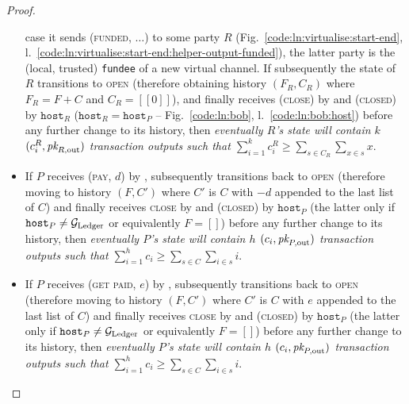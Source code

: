 \begin{proof}
\begin{itemize}
    case it sends (\textsc{funded}, $\dots$) to some party $R$
    (Fig.~\ref{code:ln:virtualise:start-end},
    l.~\ref{code:ln:virtualise:start-end:helper-output-funded}), the latter
    party is the (local, trusted) \texttt{fundee} of a new virtual channel. If
    subsequently the state of $R$ transitions to \textsc{open} (therefore
    obtaining history $(F_R, C_R)$ where $F_R = F + C$ and $C_R = [[0]]$), and
    finally receives (\textsc{close}) by \environment and (\textsc{closed}) by
    $\texttt{host}_R$ ($\texttt{host}_R = \texttt{host}_P$ --
    Fig.~\ref{code:ln:bob}, l.~\ref{code:ln:bob:host}) before any further change
    to its history, then \emph{eventually $R$'s \ledger state will contain $k$
    $(c^R_i, \textit{pk}_{R, \mathrm{out}})$ transaction outputs such that
    $\sum\limits_{i=1}^k c^R_i \geq \sum\limits_{s \in C_R} \sum\limits_{x \in
    s} x$}.
    \item If $P$ receives (\textsc{pay}, $d$) by \environment, subsequently
    transitions back to \textsc{open} (therefore moving to history $(F, C')$
    where $C'$ is $C$ with $-d$ appended to the last list of $C$) and finally
    receives \textsc{close} by \environment and (\textsc{closed}) by
    $\texttt{host}_P$ (the latter only if $\texttt{host}_P \neq \mathcal{G}_{\mathrm{Ledger}}$ or
    equivalently $F = []$) before any further change to its history, then
    \emph{eventually $P$'s \ledger state will contain $h$ $(c_i, \textit{pk}_{P,
    \mathrm{out}})$ transaction outputs such that $\sum\limits_{i=1}^h c_i \geq
    \sum\limits_{s \in C} \sum\limits_{i \in s} i$}.
    \item If $P$ receives (\textsc{get paid}, $e$) by \environment, subsequently
    transitions back to \textsc{open} (therefore moving to history $(F, C')$
    where $C'$ is $C$ with $e$ appended to the last list of $C$) and finally
    receives \textsc{close} by \environment and (\textsc{closed}) by
    $\texttt{host}_P$ (the latter only if $\texttt{host}_P \neq \mathcal{G}_{\mathrm{Ledger}}$ or
    equivalently $F = []$) before any further change to its history, then
    \emph{eventually $P$'s \ledger state will contain $h$ $(c_i, \textit{pk}_{P,
    \mathrm{out}})$ transaction outputs such that $\sum\limits_{i=1}^h c_i \geq
    \sum\limits_{s \in C} \sum\limits_{i \in s} i$}.
  \end{itemize}


\end{proof}
